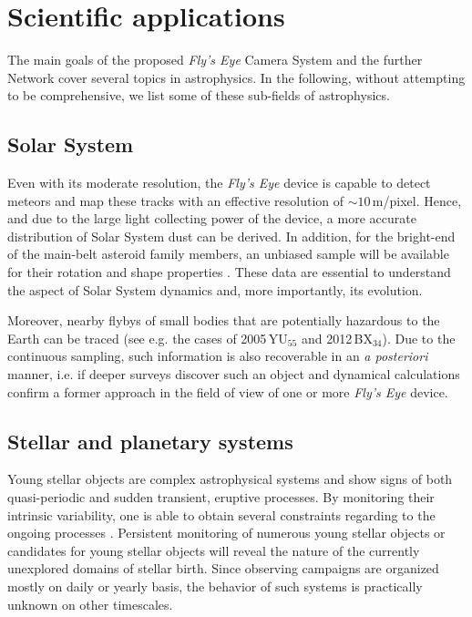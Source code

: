 \documentclass[11pt,twoside]{article}
\def\yu{2005\,YU\ensuremath{_{55}}}
\def\bx{2012\,BX\ensuremath{_{34}}}
\begin{document}
\section{Scientific applications}

The main goals of the proposed {\it Fly's Eye} Camera System
and the further Network cover several topics in astrophysics. In the following, 
without attempting to be comprehensive, we list some of these sub-fields of
astrophysics. 

\subsection{Solar System} 
Even with its moderate resolution, 
the {\it Fly's Eye} device is capable to detect meteors and map 
these tracks with an effective resolution of $\sim10$\,m/pixel. Hence,
and due to the large light collecting power of the device, a more
accurate distribution of Solar System dust can be derived. In addition,
for the bright-end of the main-belt asteroid family members, an
unbiased sample will be available for their rotation and shape
properties \citep[see also][]{durech2011}.
These data are essential to understand the aspect
of Solar System dynamics and, more importantly, its evolution. 

Moreover,
nearby flybys of small bodies that are potentially hazardous to
the Earth can be traced (see e.g. the cases of \yu{} and \bx{}). 
Due to the continuous sampling, such information
is also recoverable in an \emph{a posteriori} manner, i.e. if deeper
surveys discover such an object and dynamical calculations confirm
a former approach in the field of view of one or more {\it Fly's Eye} device.

\subsection{Stellar and planetary systems} 
Young stellar objects are complex astrophysical systems and show 
signs of both quasi-periodic and sudden 
transient, eruptive processes. By monitoring their intrinsic variability,
one is able to obtain several constraints regarding to the ongoing processes
\citep{hartmann1996,abraham2009}. 
Persistent monitoring of numerous young stellar 
objects or candidates for young stellar objects will reveal the nature of the 
currently unexplored domains of stellar birth. Since observing campaigns
are organized mostly on daily or yearly basis, the behavior of
such systems is practically unknown on other timescales. 
\end{document}
